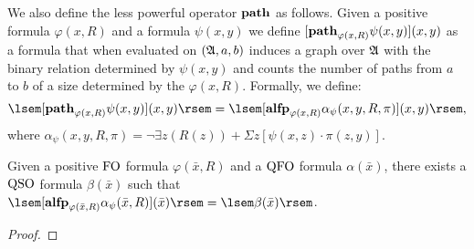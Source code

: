 We also define the less powerful operator ${\bf path}$ as follows. Given a positive formula $\varphi(x,R)$ and a formula $\psi(x,y)$ we define $[{\bf path}_{\varphi(x,R)} \psi(x,y)](x,y)$ as a formula that when evaluated on $(\mathfrak{A}, a, b)$ induces a graph over $\mathfrak{A}$ with the binary relation determined by $\psi(x,y)$ and counts the number of paths from $a$ to $b$ of a size determined by the $\varphi(x,R)$. Formally, we define:
$$
\sem{[\pth_{\varphi(x,R)} \psi(x,y)](x,y)} = \sem{[\alfp_{\varphi(x,R)} \alpha_{\psi}(x,y,R,\pi)](x,y)},
$$
where $\alpha_{\psi}(x,y,R,\pi) = \neg \exists z(R(z)) + \Sigma z[\psi(x,z)\cdot \pi(z,y)]$.


\begin{theorem}
	Given a positive ${\rm FO}$ formula $\varphi(\bar{x},R)$ and a ${\rm QFO}$ formula $\alpha(\bar{x})$, there exists a ${\rm QSO}$ formula $\beta(\bar{x})$ such that $\sem{[\alfp_{\varphi(\bar{x},R)} \alpha_{\psi}(\bar{x},R)](\bar{x})} = \sem{\beta(\bar{x})}$.
\end{theorem}
\begin{proof}
	
\end{proof}
